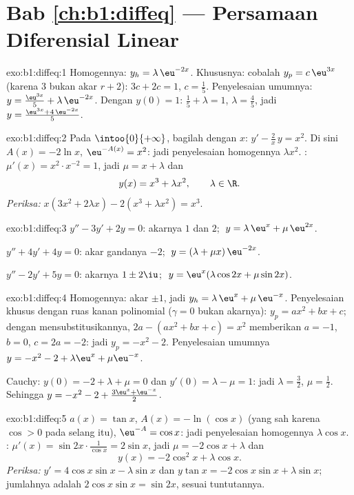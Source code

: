 \section*{Bab \ref{ch:b1:diffeq} --- Persamaan Diferensial Linear}

\begin{solution}{exo:b1:diffeq:1}
Homogennya: $y_h = \lambda\,\eu^{-2x}$. Khususnya: cobalah $y_p =
c\,\eu^{3x}$ (karena $3$ bukan akar $r + 2$): $3c + 2c = 1$, $c =
\frac15$. Penyelesaian umumnya: $y = \frac{\eu^{3x}}{5} +
\lambda\,\eu^{-2x}$. Dengan $y(0) = 1$: $\frac15 + \lambda = 1$,
$\lambda = \frac45$, jadi $y = \frac{\eu^{3x} + 4\,\eu^{-2x}}{5}$.
\end{solution}

\begin{solution}{exo:b1:diffeq:2}
Pada $\intoo{0}{+\infty}$, bagilah dengan $x$: $y' - \frac{2}{x}\,y = x^2$.
Di sini $A(x) = -2\ln x$, $\eu^{-A(x)} = x^2$: jadi penyelesaian homogennya
$\lambda x^2$. : $\mu'(x) = x^2 \cdot x^{-2} =
1$, jadi $\mu = x + \lambda$ dan
\[
y(x) = x^3 + \lambda x^2, \qquad \lambda \in \R .
\]
\emph{Periksa:} $x(3x^2 + 2\lambda x) - 2(x^3 + \lambda x^2) = x^3$.
\end{solution}

\begin{solution}{exo:b1:diffeq:3}
$y'' - 3y' + 2y = 0$: akarnya $1$ dan $2$; $\;y = \lambda\,\eu^{x} +
\mu\,\eu^{2x}$.

$y'' + 4y' + 4y = 0$: akar gandanya $-2$; $\;y = (\lambda + \mu
x)\,\eu^{-2x}$.

$y'' - 2y' + 5y = 0$: akarnya $1 \pm 2\iu$; $\;y = \eu^{x}(\lambda\cos
2x + \mu\sin 2x)$.
\end{solution}

\begin{solution}{exo:b1:diffeq:4}
Homogennya: akar $\pm 1$, jadi $y_h = \lambda\,\eu^x + \mu\,\eu^{-x}$.
Penyelesaian khusus dengan ruas kanan polinomial ($\gamma = 0$ bukan akarnya):
$y_p = ax^2 + bx + c$; dengan mensubstitusikannya, $2a - (ax^2 + bx + c) = x^2$
memberikan $a = -1$, $b = 0$, $c = 2a = -2$: jadi $y_p = -x^2 - 2$. Penyelesaian
umumnya $y = -x^2 - 2 + \lambda\eu^x + \mu\eu^{-x}$.

Cauchy: $y(0) = -2 + \lambda + \mu = 0$ dan $y'(0) = \lambda - \mu =
1$: jadi $\lambda = \frac32$, $\mu = \frac12$. Sehingga
$y = -x^2 - 2 + \frac{3\eu^x + \eu^{-x}}{2}$.
\end{solution}

\begin{solution}{exo:b1:diffeq:5}
$a(x) = \tan x$, $A(x) = -\ln(\cos x)$ (yang sah karena $\cos > 0$ pada
selang itu), $\eu^{-A} = \cos x$: jadi penyelesaian homogennya $\lambda\cos x$.
: $\mu'(x) = \sin 2x \cdot \frac{1}{\cos x} =
2\sin x$, jadi $\mu = -2\cos x + \lambda$ dan
\[
y(x) = -2\cos^2 x + \lambda \cos x .
\]
\emph{Periksa:} $y' = 4\cos x \sin x - \lambda\sin x$ dan $y\tan x =
-2\cos x\sin x + \lambda \sin x$; jumlahnya adalah $2\cos x\sin x =
\sin 2x$, sesuai tuntutannya.
\end{solution}

